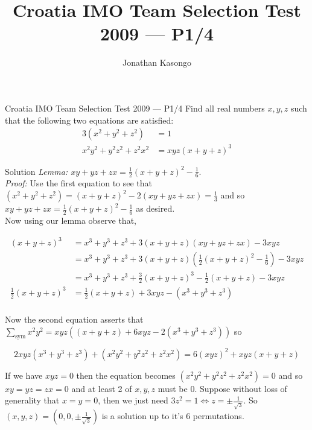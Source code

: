 \documentclass{article}
\author{Jonathan Kasongo}
\title{Croatia IMO Team Selection Test 2009 --- P1/4}
\begin{document}
\maketitle

\begin{problem}{Croatia IMO Team Selection Test 2009 --- P1/4}
Find all real numbers $x, y, z$ such that the following two equations are satisfied:
$$
\begin{aligned}
3\left(x^2+y^2+z^2\right) & =1 \\
x^2 y^2+y^2 z^2+z^2 x^2 & =x y z(x+y+z)^3
\end{aligned}
$$
\end{problem}

\begin{solution}{Solution}
\textit{Lemma: $xy + yz + zx = \frac{1}{2} (x+y+z)^2 - \frac{1}{6}$}.\\

\textit{Proof:} Use the first equation to see that $(x^2+y^2+z^2) =
(x+y+z)^2 - 2(xy+yz+zx) = \frac{1}{3}$ and so
$xy + yz + zx = \frac{1}{2} (x+y+z)^2 - \frac{1}{6}$ as desired.\\

Now using our lemma observe that,

\[
\begin{aligned}
(x+y+z)^3 &= x^3 + y^3 + z^3 + 3(x+y+z)(xy+yz+zx) - 3xyz \\
&= x^3 + y^3 + z^3 + 3(x+y+z)\left(\frac{1}{2} (x+y+z)^2 - \frac{1}{6}\right) - 3xyz \\
&= x^3 + y^3 + z^3 + \frac{3}{2}(x+y+z)^3 - \frac{1}{2} (x+y+z) - 3xyz\\
\frac{1}{2}(x+y+z)^3 &= \frac{1}{2} (x+y+z) + 3xyz - (x^3 + y^3 + z^3)\\
\end{aligned}
\]

Now the second equation asserts that
$\sum_{\text{sym}} x^2 y^2 = xyz((x+y+z) + 6xyz - 2(x^3+y^3+z^3))$ so

$$
2xyz(x^3 + y^3 + z^3) + (x^2 y^2 + y^2 z^2 + z^2 x^2) =
6(xyz)^2 + xyz(x+y+z)
$$

If we have $xyz=0$ then the equation becomes
$(x^2 y^2 + y^2 z^2 + z^2 x^2) = 0$ and so $xy = yz = zx = 0$ and
at least 2 of $x,y,z$ must be 0. Suppose without loss of generality that
$x=y=0$, then we just need $3z^2 = 1 \iff z = \pm \frac{1}{\sqrt{3}}$.
So $(x,y,z)=\left(0,0,\pm \frac{1}{\sqrt{3}}\right)$ is a solution up to it's 6 permutations.\\



\end{solution}
\end{document}
